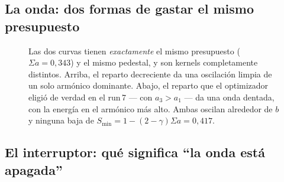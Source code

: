 \documentclass[12pt]{extarticle}
\newcommand{\figcap}[1]{\caption{\small #1}}
\newcommand{\ssum}{\Sigma a}
\begin{document}
\subsection{La onda: dos formas de gastar el mismo presupuesto}

\begin{figure}[H]\centering
{}
\figcap{Las dos curvas tienen \emph{exactamente} el mismo presupuesto
($\ssum=0{,}343$) y el mismo pedestal, y son kernels completamente distintos.
Arriba, el reparto decreciente da una oscilación limpia de un solo armónico
dominante. Abajo, el reparto que el optimizador eligió de verdad en el run\,7
--- con $a_3>a_1$ --- da una onda dentada, con la energía en el armónico más
alto. Ambas oscilan alrededor de $b$ y ninguna baja de
$S_{\min}=1-(2-\gamma)\ssum=0{,}417$.}
\end{figure}

\subsection{El interruptor: qué significa ``la onda está apagada''}
\end{document}
